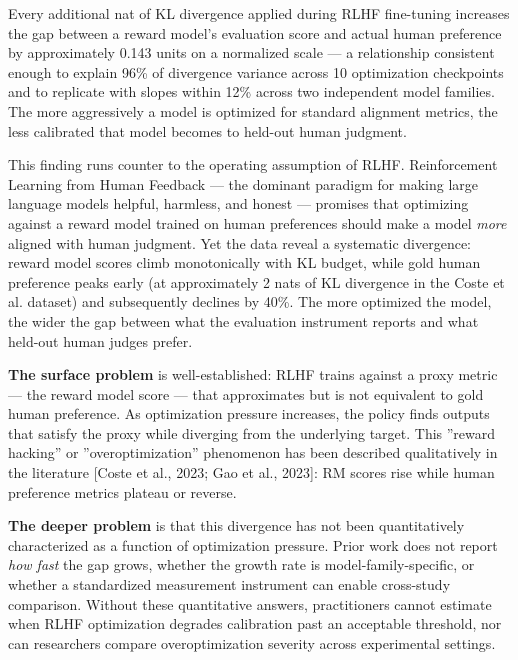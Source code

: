 
Every additional nat of KL divergence applied during RLHF fine-tuning increases the gap between a reward model's evaluation score and actual human preference by approximately 0.143 units on a normalized scale --- a relationship consistent enough to explain 96\% of divergence variance across 10 optimization checkpoints and to replicate with slopes within 12\% across two independent model families. The more aggressively a model is optimized for standard alignment metrics, the less calibrated that model becomes to held-out human judgment.

This finding runs counter to the operating assumption of RLHF. Reinforcement Learning from Human Feedback --- the dominant paradigm for making large language models helpful, harmless, and honest --- promises that optimizing against a reward model trained on human preferences should make a model \textit{more} aligned with human judgment. Yet the data reveal a systematic divergence: reward model scores climb monotonically with KL budget, while gold human preference peaks early (at approximately 2 nats of KL divergence in the Coste et al. dataset) and subsequently declines by 40\%. The more optimized the model, the wider the gap between what the evaluation instrument reports and what held-out human judges prefer.

\textbf{The surface problem} is well-established: RLHF trains against a proxy metric --- the reward model score --- that approximates but is not equivalent to gold human preference. As optimization pressure increases, the policy finds outputs that satisfy the proxy while diverging from the underlying target. This ''reward hacking'' or ''overoptimization'' phenomenon has been described qualitatively in the literature [Coste et al., 2023; Gao et al., 2023]: RM scores rise while human preference metrics plateau or reverse.

\textbf{The deeper problem} is that this divergence has not been quantitatively characterized as a function of optimization pressure. Prior work does not report \textit{how fast} the gap grows, whether the growth rate is model-family-specific, or whether a standardized measurement instrument can enable cross-study comparison. Without these quantitative answers, practitioners cannot estimate when RLHF optimization degrades calibration past an acceptable threshold, nor can researchers compare overoptimization severity across experimental settings.

